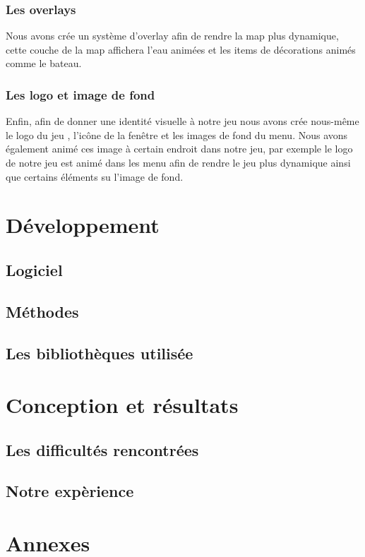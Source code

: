 \documentclass{article}
\begin{document}
\subsubsection{Les overlays}
Nous avons crée un système d'overlay afin de rendre la map plus dynamique, cette couche de la map affichera l'eau animées et les items de décorations animés comme le bateau.

\subsubsection{Les logo et image de fond}
Enfin, afin de donner une identité visuelle à notre jeu nous avons crée nous-même le logo du jeu , l'icône de la fenêtre et les images de fond du menu. Nous avons également animé ces image à certain endroit dans notre jeu, par exemple le logo de notre jeu est animé dans les menu afin de rendre le jeu plus dynamique ainsi que certains éléments su l'image de fond.

\section{Développement}
\subsection{Logiciel}
\subsection{Méthodes}
\subsection{Les bibliothèques utilisée}
\section{Conception et résultats}
\subsection{Les difficultés rencontrées}
\subsection{Notre expèrience}
\section{Annexes}
\end{document}
